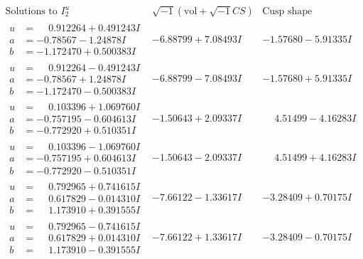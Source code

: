 \documentclass[1p]{elsarticle_modified}
\theoremstyle{definition}
\newcommand{\I}{\sqrt{-1}}
\begin{document}
$$\begin{array}{c|c|c}  
\text{Solutions to }I^u_{2}& \I (\text{vol} + \sqrt{-1}CS) & \text{Cusp shape}\\
 \hline 
\begin{aligned}
u &= \phantom{-}0.912264 + 0.491243 I \\
a &= -0.78567 - 1.24878 I \\
b &= -1.172470 + 0.500383 I\end{aligned}
 & -6.88799 + 7.08493 I & -1.57680 - 5.91335 I \\ \hline\begin{aligned}
u &= \phantom{-}0.912264 - 0.491243 I \\
a &= -0.78567 + 1.24878 I \\
b &= -1.172470 - 0.500383 I\end{aligned}
 & -6.88799 - 7.08493 I & -1.57680 + 5.91335 I \\ \hline\begin{aligned}
u &= \phantom{-}0.103396 + 1.069760 I \\
a &= -0.757195 - 0.604613 I \\
b &= -0.772920 + 0.510351 I\end{aligned}
 & -1.50643 + 2.09337 I & \phantom{-}4.51499 - 4.16283 I \\ \hline\begin{aligned}
u &= \phantom{-}0.103396 - 1.069760 I \\
a &= -0.757195 + 0.604613 I \\
b &= -0.772920 - 0.510351 I\end{aligned}
 & -1.50643 - 2.09337 I & \phantom{-}4.51499 + 4.16283 I \\ \hline\begin{aligned}
u &= \phantom{-}0.792965 + 0.741615 I \\
a &= \phantom{-}0.617829 - 0.014310 I \\
b &= \phantom{-}1.173910 + 0.391555 I\end{aligned}
 & -7.66122 - 1.33617 I & -3.28409 + 0.70175 I \\ \hline\begin{aligned}
u &= \phantom{-}0.792965 - 0.741615 I \\
a &= \phantom{-}0.617829 + 0.014310 I \\
b &= \phantom{-}1.173910 - 0.391555 I\end{aligned}
 & -7.66122 + 1.33617 I & -3.28409 - 0.70175 I \\ \hline\begin{aligned}

\end{aligned}
\end{array}$$
\end{document}
